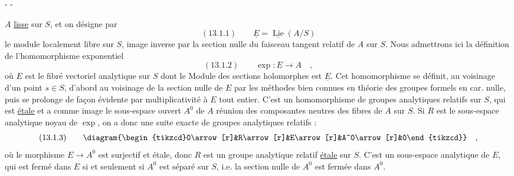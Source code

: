 \begin{center}-  -\end{center}
$A$ \uline{lisse} sur $S$, et on désigne par
\[
(13.1.1)\qquad\underline E=\underline{\operatorname{Lie}}(A/S)
\]
le module localement libre sur $S$, image inverse par la section nulle du faisceau tangent relatif de $A$ sur $S$. Nous admettrons ici la définition de l'homomorphisme exponentiel
\[
(13.1.2)\qquad\exp:E\longrightarrow A\quad,
\]
où $E$ est le fibré vectoriel analytique sur $S$ dont le Module des sections holomorphes est $\underline E$. Cet homomorphisme se définit, au voisinage d'un point $s\in S$, d'abord au voisinage de la section nulle de $E$ par les méthodes bien connues en théorie des groupes formels en car. nulle, puis se prolonge de façon évidente par multiplicativité à $E$ tout entier. C'est un homomorphisme de groupes analytiques relatifs sur $S$, qui est \uline{étale} et a comme image le sous-espace ouvert $A^0$ de $A$ réunion des composantes neutres des fibres de $A$ sur $S$. Si $R$ est le sous-espace analytique noyau de $\exp$, on a donc une suite exacte de groupes analytiques relatifs :
\[
(13.1.3)\qquad
\diagram{\begin{tikzcd}0\arrow[r]&R\arrow[r]&E\arrow[r]&A^0\arrow[r]&0\end{tikzcd}}\quad,
\]
où le morphisme $E\longrightarrow A^0$ est surjectif et étale, donc $R$ est un groupe analytique relatif \uline{étale} sur $S$. C'est un sous-espace analytique de $E$, qui est fermé dans $E$ si et seulement si $A^0$ est séparé sur $S$, i.e. la section nulle de $A^0$ est fermée dans $A^0$.

